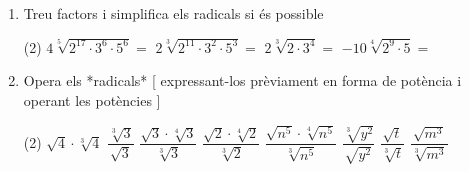 \documentclass[a4paper]{article},
\begin{document}
\begin{enumerate}[resume]
    \item Treu factors i simplifica els radicals si és possible
    \begin{tasks}(2)
      \task $4  \sqrt[5]{2^{17} \cdot 3^{6} \cdot 5^{6}}{}={}$
      \task $2  \sqrt[3]{2^{11} \cdot 3^{2} \cdot 5^{3}}{}={}$
      \task $2  \sqrt[3]{2 \cdot 3^{4}}{}={}$
      \task $-10  \sqrt[4]{2^{9} \cdot 5}{}={}$
    \end{tasks}
    \item Opera els *radicals* [ expressant-los prèviament en forma de potència i operant les potències ]
    \begin{tasks}(2)
      \task $ \sqrt{4} \cdot  \sqrt[3]{4}$
      \task $\dfrac{ \sqrt[3]{3} }{  \sqrt{3}}$
      \task $\dfrac{ \sqrt{3} \cdot  \sqrt[4]{3}}{ \sqrt[3]{3}}$
      \task $\dfrac{ \sqrt{2} \cdot  \sqrt[4]{2}}{ \sqrt[3]{2}}$
      \task $\dfrac{ \sqrt{n^{5}} \cdot  \sqrt[4]{n^{5}}}{ \sqrt[3]{n^{5}}}$
      \task $\dfrac{ \sqrt[3]{y^{2}} }{  \sqrt{y^{2}}}$
      \task $\dfrac{ \sqrt{t} }{  \sqrt[3]{t}}$
      \task $\dfrac{ \sqrt{m^{3}} }{  \sqrt[3]{m^{3}}}$
    \end{tasks}
     \end{enumerate}
\end{document}
